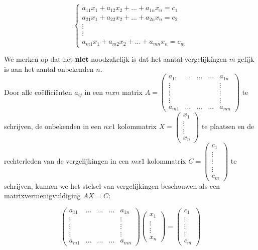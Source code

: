 \[ 
\left\{ \begin{array}{l}
a_{11} x_1 + a_{12} x_2 + ... + a_{1n} x_n = c_1 \\
a_{21} x_1 + a_{22} x_2 + ... + a_{2n} x_n = c_2 \\
\vdots \\ \vdots \\
a_{m1} x_1 + a_{m2} x_2 + ... + a_{mn} x_n = c_m
\end{array}
\right.
\]

We merken op dat het {\bf niet} noodzakelijk is dat het aantal vergelijkingen $m$ gelijk is aan het aantal onbekenden $n$.\\

Door alle co\"{e}ffici\"{e}nten $a_{ij}$ in een $mxn$ matrix $A=\left( \begin{matrix} a_{11} & \ldots & \ldots & \ldots & a_{1n} \\ \vdots & & & & \vdots \\ \vdots & & & & \vdots \\ \vdots & & & & \vdots \\ a_{m1} & \ldots & \ldots & \ldots & a_{mn} \end{matrix} \right) $ te schrijven, de onbekenden in een $nx1$ kolommatrix $X=\left( \begin{matrix} x_1 \\ \vdots \\ \vdots \\ x_n \end{matrix} \right) $ te plaatsen en de rechterleden van de vergelijkingen in een $mx1$ kolommatrix $C=\left( \begin{matrix} c_1 \\ \vdots \\ \vdots \\ \vdots \\ c_m \end{matrix} \right) $ te schrijven, kunnen we het stelsel van vergelijkingen beschouwen als een matrixvermenigvuldiging $AX=C$:

\[ 
\left( \begin{matrix} a_{11} & \ldots & \ldots & \ldots & a_{1n} \\ \vdots & & & & \vdots \\ \vdots & & & & \vdots \\ \vdots & & & & \vdots \\ a_{m1} & \ldots & \ldots & \ldots & a_{mn} \end{matrix} \right) \left( \begin{matrix} x_1 \\ \vdots \\ \vdots \\ x_n \end{matrix} \right) = \left( \begin{matrix} c_1 \\ \vdots \\ \vdots \\ \vdots \\ c_m \end{matrix} \right)
\]

